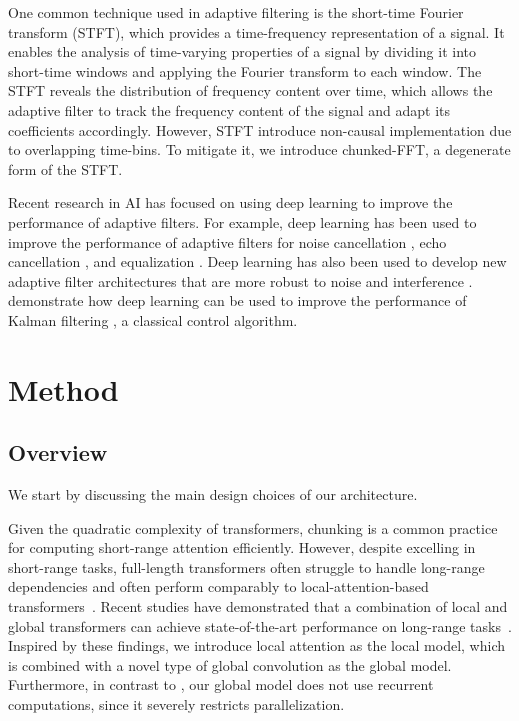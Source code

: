 \documentclass[11pt]{article}
\begin{document}
One common technique used in adaptive filtering is the short-time Fourier transform (STFT), which provides a time-frequency representation of a signal. It enables the analysis of time-varying properties of a signal by dividing it into short-time windows and applying the Fourier transform to each window. The STFT reveals the distribution of frequency content over time, which allows the adaptive filter to track the frequency content of the signal and adapt its coefficients accordingly. 
However, STFT introduce non-causal implementation due to overlapping time-bins. To mitigate it, we introduce chunked-FFT, a degenerate form of the STFT.

Recent research in AI has focused on using deep learning to improve the performance of adaptive filters. For example, deep learning has been used to improve the performance of adaptive filters for noise cancellation \cite{ZHANG20211}, echo cancellation \cite{haubner2022deep}, and equalization \cite{Zhou_2020}. Deep learning has also been used to develop new adaptive filter architectures that are more robust to noise and interference \cite{s22165935}.
\citet{Revach_2022} demonstrate how deep learning can be used to improve the performance of Kalman filtering \cite{kalman1960new}, a classical control algorithm. 



\section{Method}

\subsection{Overview}
We start by discussing the main design choices of our architecture.

Given the quadratic complexity of transformers, chunking is a common practice for computing short-range attention efficiently. However, despite excelling in short-range tasks, full-length transformers often struggle to handle long-range dependencies and often perform comparably to local-attention-based transformers~\cite{xiong2021simple}. Recent studies have demonstrated that a combination of local and global transformers can achieve state-of-the-art performance on long-range tasks~\cite{ivgi2023efficient,yu2023megabyte,hutchins2022block}. Inspired by these findings, we introduce local attention as the local model, which is combined with a novel type of global convolution as the global model. Furthermore, in contrast to \cite{hutchins2022block, bulatov2023scaling}, our global model does not use recurrent computations, since it severely restricts parallelization.
\end{document}
